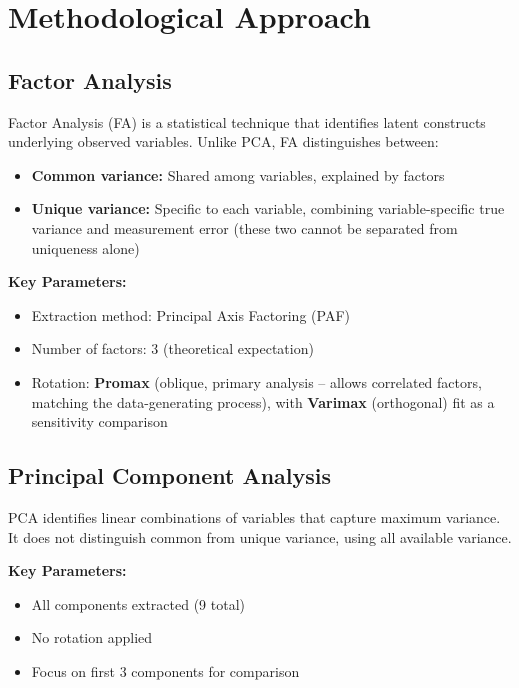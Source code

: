 \documentclass[
]{article}
\begin{document}
\section{Methodological Approach}

\subsection{Factor Analysis}

Factor Analysis (FA) is a statistical technique that identifies latent
constructs underlying observed variables. Unlike PCA, FA distinguishes
between:

\begin{itemize}
\item
  \textbf{Common variance:} Shared among variables, explained by factors
\item
  \textbf{Unique variance:} Specific to each variable, combining
  variable-specific true variance and measurement error (these two
  cannot be separated from uniqueness alone)
\end{itemize}

\textbf{Key Parameters:}

\begin{itemize}
\item
  Extraction method: Principal Axis Factoring (PAF)
\item
  Number of factors: 3 (theoretical expectation)
\item
  Rotation: \textbf{Promax} (oblique, primary analysis -- allows
  correlated factors, matching the data-generating process), with
  \textbf{Varimax} (orthogonal) fit as a sensitivity comparison
\end{itemize}

\subsection{Principal Component Analysis}

PCA identifies linear combinations of variables that capture maximum
variance. It does not distinguish common from unique variance, using all
available variance.

\textbf{Key Parameters:}

\begin{itemize}
\item
  All components extracted (9 total)
\item
  No rotation applied
\item
  Focus on first 3 components for comparison
\end{itemize}
\end{document}
